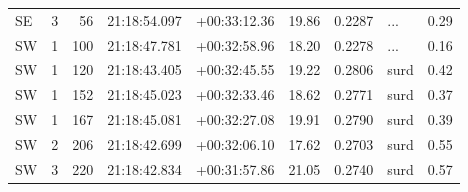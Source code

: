 \begin{tabular}{lrrllrrlr}
  SE &       3 &     56 &  21:18:54.097 &  +00:33:12.36 &  19.86 &    0.2287 &        ... &        0.29 \\
  SW &       1 &    100 &  21:18:47.781 &  +00:32:58.96 &  18.20 &    0.2278 &        ... &        0.16 \\
  SW &       1 &    120 &  21:18:43.405 &  +00:32:45.55 &  19.22 &    0.2806 &       surd &        0.42 \\
  SW &       1 &    152 &  21:18:45.023 &  +00:32:33.46 &  18.62 &    0.2771 &       surd &        0.37 \\
  SW &       1 &    167 &  21:18:45.081 &  +00:32:27.08 &  19.91 &    0.2790 &       surd &        0.39 \\
  SW &       2 &    206 &  21:18:42.699 &  +00:32:06.10 &  17.62 &    0.2703 &       surd &        0.55 \\
  SW &       3 &    220 &  21:18:42.834 &  +00:31:57.86 &  21.05 &    0.2740 &       surd &        0.57 \\
\bottomrule
\end{tabular}
